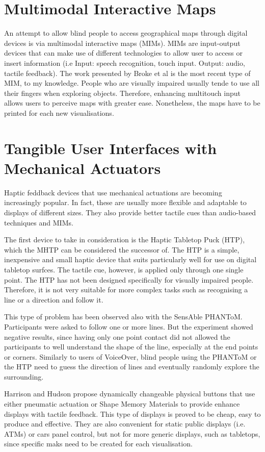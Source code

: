 \section{Multimodal Interactive Maps}
An attempt to allow blind people to access geographical maps through digital devices is via multimodal interactive maps (MIMs). MIMs are input-output devices that can make use of different technologies to allow user to access or insert information (i.e Input: speech recognition, touch input. Output: audio, tactile feedback). The work presented by Broke et al \cite{brock2010usage} is the most recent type of MIM, to my knowledge. People who are visually impaired usually tende to use all their fingers when exploring objects. Therefore, enhancing multitouch input allows users to perceive maps with greater ease. Nonetheless, the maps have to be printed for each new visualisations. 

\section{Tangible User Interfaces with Mechanical Actuators}
Haptic feddback devices that use mechanical actuations are becoming increasingly popular. In fact, these are usually more flexible and adaptable to displays of different sizes. They also provide better tactile cues than audio-based techniques and MIMs.

The first device to take in consideration is the Haptic Tabletop Puck (HTP)\cite{marquardt2009haptic}, which the MHTP can be considered the successor of. The HTP is a simple, inexpensive and small haptic device that suits particularly well for use on digital tabletop surfces. The tactile cue, however, is applied only through one single point. The HTP has not been designed specifically for visually impaired people. Therefore, it is not very suitable for more complex tasks such as recognising a line or a direction and follow it. 

This type of problem has been observed also with the SensAble PHANToM\cite{massie1994phantom, yu2001haptic}. Participants were asked to follow one or more lines. But the experiment showed negative results, since having only one point contact did not allowed the participants to well understand the shape of the line, especially at the end points or corners. Similarly to users of VoiceOver, blind people using the PHANToM or the HTP need to guess the direction of lines and eventually randomly explore the surrounding. 

Harrison and Hudson \cite{harrison2009providing} propose dynamically changeable physical buttons that use either pneumatic actuation or Shape Memory Materials to provide enhance displays with tactile feedback. This type of displays is proved to be cheap, easy to produce and effective. They are also convenient for static public displays (i.e. ATMs) or cars panel control, but not for more generic displays, such as tabletops, since specific maks need to be created for each visualisation. 


